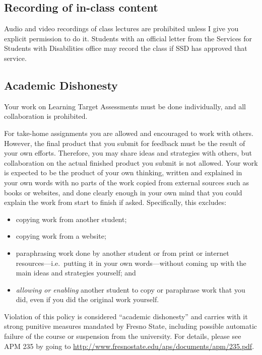 \hypertarget{recording-of-in-class-content}{%
\subsection{Recording of in-class
content}\label{recording-of-in-class-content}}

Audio and video recordings of class lectures are prohibited unless I
give you explicit permission to do it. Students with an official letter
from the Services for Students with Disabilities office may record the
class if SSD has approved that service.

\hypertarget{academic-dishonesty}{%
\subsection{Academic Dishonesty}\label{academic-dishonesty}}

Your work on Learning Target Assessments must be done individually, and
all collaboration is prohibited.

For take-home assignments you are allowed and encouraged to work with
others. However, the final product that you submit for feedback must be
the result of your own efforts. Therefore, you may share ideas and
strategies with others, but collaboration on the actual finished product
you submit is not allowed. Your work is expected to be the product of
your own thinking, written and explained in your own words with no parts
of the work copied from external sources such as books or websites, and
done clearly enough in your own mind that you could explain the work
from start to finish if asked. Specifically, this excludes:

\begin{itemize}
\tightlist
\item
  copying work from another student;
\item
  copying work from a website;
\item
  paraphrasing work done by another student or from print or internet
  resources---i.e.~putting it in your own words---without coming up with
  the main ideas and strategies yourself; and
\item
  \emph{allowing or enabling} another student to copy or paraphrase work
  that you did, even if you did the original work yourself.
\end{itemize}

Violation of this policy is considered ``academic dishonesty'' and
carries with it strong punitive measures mandated by Fresno State,
including possible automatic failure of the course or suspension from
the university. For details, please see APM 235 by going to
\url{http://www.fresnostate.edu/aps/documents/apm/235.pdf}.

